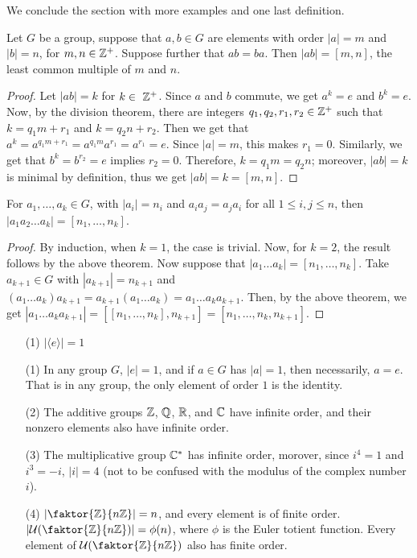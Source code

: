 We conclude the section with more examples and one last definition.

\begin{proposition}\label{proposition_1.2.5}
  Let $G$ be a group, suppose that  $a,b \in G$ are elements with
  order $|a|=m$ and  $|b|=n$, for  $m,n \in \mathbb{Z}^+$. Suppose further
  that $ab=ba$. Then $|ab|=[m,n]$, the least common multiple of $m$
  and  $n$.
\end{proposition}
\begin{proof}
  Let $|ab|=k$ for $k \in \ \mathbb{Z}^+$. Since  $a$ and  $b$ commute, we get
  $a^k=e$ and  $b^k=e$. Now, by the division theorem, there are integers
  $q_1,q_2,r_1,r_2 \in \mathbb{Z}^+$ such that $k=q_1m+r_1$ and $k=q_2n+r_2$. Then we
  get that $a^k=a^{q_1m+r_1}=a^{q_1m}a^{r_1}=a^{r_1}=e$. Since $|a|=m$,
  this makes $r_1=0$. Similarly, we get that $b^k=b^{r_2}=e$ implies $r_2=0$.
  Therefore, $k=q_1m=q_2n$; moreover, $|ab|=k$ is minimal by definition,
  thus we get $|ab|=k=[m,n]$.
\end{proof}
\begin{corollary}
  For $a_1, \dots, a_k \in G$, with $|a_i|=n_i$ and $a_ia_j=a_ja_i$ for
  all  $1 \leq i,j \leq n$, then  $|a_1a_2 \dots a_k|=[n_1, \dots, n_k]$.
\end{corollary}
\begin{proof}
  By induction, when $k=1$, the case is trivial. Now, for  $k=2$, the result
  follows by the above theorem. Now suppose that $|a_1 \dots a_k|=[n_1,
  \dots, n_k]$. Take $a_{k+1} \in G$ with $|a_{k+1}|=n_{k+1}$ and $(a_1
  \dots a_k)a_{k+1}=a_{k+1}(a_1 \dots a_k)=a_1 \dots a_ka_{k+1}$. Then, by the
  above theorem, we get $|a_1 \dots a_ka_{k+1}|=[[n_1, \dots, n_k],
  n_{k+1}]=[n_1, \dots, n_k, n_{k+1}]$.
\end{proof}

\begin{example}
  \begin{enumerate}
    \item[(1)] $|\langle e \rangle|=1$
    \item[(1)] In any group $G$,  $|e|=1$, and if $a \in G$ has
      $|a|=1$, then necessarily, $a=e$. That is in any group, the only
      element of order  $1$ is the identity.

    \item[(2)] The additive groups $\mathbb{Z}$,  $\mathbb{Q}$,  $\mathbb{R}$, and  $\mathbb{C}$ have
      infinite order, and their nonzero elements also have infinite order.

    \item[(3)] The multiplicative group $\mathbb{C}^*$ has infinite order, morover,
      since $i^4=1$ and $i^3=-i$, $|i|=4$ (not to be confused with the
      modulus of the complex number $i$).

    \item[(4)] $|\faktor{\Z}{n\Z}|=n$, and every element is of finite
      order. $|\Uc{(\faktor{\Z}{n\Z})}|=\phi(n)$, where $\phi$ is the Euler
      totient function. Every element of $\Uc{(\faktor{\Z}{n\Z})}$ also has
      finite order.
  \end{enumerate}
\end{example}

